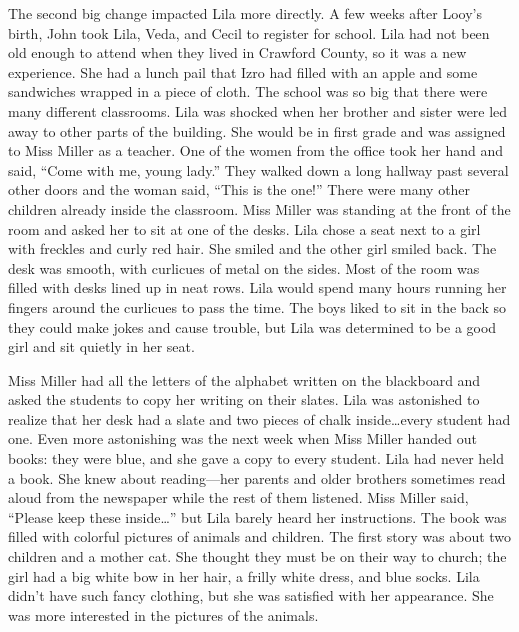 \documentclass[
  american,
  letterpaper,
]{book}
\begin{document}
The second big change impacted Lila more directly. A few weeks after
Looy's birth, John took Lila, Veda, and Cecil to register for school.
Lila had not been old enough to attend when they lived in Crawford
County, so it was a new experience. She had a lunch pail that Izro had
filled with an apple and some sandwiches wrapped in a piece of cloth.
The school was so big that there were many different classrooms. Lila
was shocked when her brother and sister were led away to other parts of
the building. She would be in first grade and was assigned to Miss
Miller as a teacher. One of the women from the office took her hand and
said, ``Come with me, young lady.'' They walked down a long hallway past
several other doors and the woman said, ``This is the one!'' There were
many other children already inside the classroom. Miss Miller was
standing at the front of the room and asked her to sit at one of the
desks. Lila chose a seat next to a girl with freckles and curly red
hair. She smiled and the other girl smiled back. The desk was smooth,
with curlicues of metal on the sides. Most of the room was filled with
desks lined up in neat rows. Lila would spend many hours running her
fingers around the curlicues to pass the time. The boys liked to sit in
the back so they could make jokes and cause trouble, but Lila was
determined to be a good girl and sit quietly in her seat.

Miss Miller had all the letters of the alphabet written on the
blackboard and asked the students to copy her writing on their slates.
Lila was astonished to realize that her desk had a slate and two pieces
of chalk inside\ldots every student had one. Even more astonishing was
the next week when Miss Miller handed out books: they were blue, and she
gave a copy to every student. Lila had never held a book. She knew about
reading---her parents and older brothers sometimes read aloud from the
newspaper while the rest of them listened. Miss Miller said, ``Please
keep these inside\ldots{}'' but Lila barely heard her instructions. The
book was filled with colorful pictures of animals and children. The
first story was about two children and a mother cat. She thought they
must be on their way to church; the girl had a big white bow in her
hair, a frilly white dress, and blue socks. Lila didn't have such fancy
clothing, but she was satisfied with her appearance. She was more
interested in the pictures of the animals.
\end{document}
